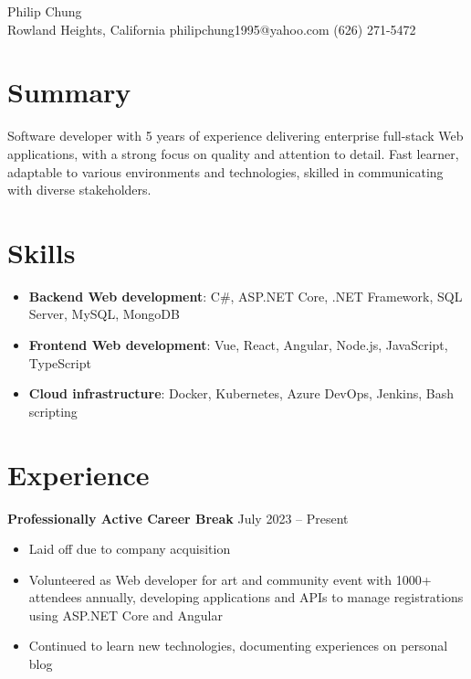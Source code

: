 \documentclass[12pt]{article}
\newcommand{\titleheader}[2]{\textbf{#1} \symbol{"B7} #2}
\begin{document}
	\begin{center}
		{\headerfont\fontsize{24pt}{24pt}\selectfont Philip Chung} \\ \vspace{0.5em}
		Rowland Heights, California  philipchung1995@yahoo.com  (626) 271-5472
	\end{center}

	\section*{Summary}

	Software developer with 5 years of experience delivering enterprise full-stack Web applications, with a strong focus on quality and attention to detail. Fast learner, adaptable to various environments and technologies, skilled in communicating with diverse stakeholders.

	\section*{Skills}

	\newcommand{\skillitem}[2]{\item \textbf{#1}: #2}

	\begin{itemize}[left=0.25in .. 0.25in,label={},itemindent=-0.25in]
		\skillitem{Backend Web development}{C\#, ASP.NET Core, .NET Framework, SQL Server, MySQL, MongoDB}
		\skillitem{Frontend Web development}{Vue, React, Angular, Node.js, JavaScript, TypeScript}
		\skillitem{Cloud infrastructure}{Docker, Kubernetes, Azure DevOps, Jenkins, Bash scripting}
	\end{itemize}

	\section*{Experience}

	\titleheader{Professionally Active Career Break}{July 2023 -- Present}

	\begin{itemize}
		\item Laid off due to company acquisition
		\item Volunteered as Web developer for art and community event with 1000+ attendees annually, developing applications and APIs to manage registrations using ASP.NET Core and Angular
		\item Continued to learn new technologies, documenting experiences on personal blog
	\end{itemize}
\end{document}
